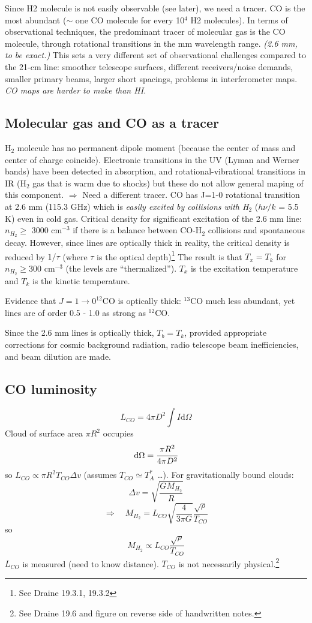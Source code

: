 \documentclass[11pt]{article}
\newcommand{\mar}[1]{\hspace{0pt}\marginpar{-\textcolor{black}{#1}-}}
\newcommand{\mynotes}[1]{{\fontfamily{cmss}\selectfont \textit{#1}}}
\begin{document}
Since H2 molecule is not
easily observable (see later), we need a tracer. CO is the most abundant
($\sim$ one CO molecule for every 10$^{4}$ H2 molecules). In terms of
observational techniques, the predominant tracer of molecular gas is the
CO molecule, through rotational transitions in the mm wavelength range.
\mynotes{(2.6 mm, to be exact.)}
This sets a very different set of observational challenges compared to the
21-cm line: smoother telescope surfaces, different receivers/noise demands,
smaller primary beams, larger short spacings, problems in interferometer
maps. \mynotes{CO maps are harder to make than HI.}

\subsection{Molecular gas and CO as a tracer}
\mar{128}H$_{2}$ molecule has no permanent dipole moment (because the
center of mass and center of charge coincide). Electronic transitions in the
UV (Lyman and Werner bands) have been detected in absorption, and
rotational-vibrational transitions in IR (H$_{2}$ gas that is warm due to shocks)
but these do not allow general maping of this component.
$\Rightarrow$ Need a different tracer. CO has J=1-0 rotational transition
at 2.6 mm (115.3 GHz) which is \emph{easily excited by collisions with
H$_{2}$} ($h\nu/k$ = 5.5 K) even in cold gas. Critical density for
significant excitation of the 2.6 mm line:
$n_{H_{2}} \geq$ 3000 cm$^{-3}$ if there is a balance between CO-H$_{2}$
collisions and spontaneous decay. However, since lines are optically thick
in reality, the critical density is reduced by $1/\tau$ (where $\tau$ is the
optical depth)\footnote{
    See Draine 19.3.1, 19.3.2}
The result is that $T_{x} = T_{k}$ for $n_{H_{2}} \geq 300$ cm$^{-3}$
(the levels are ``thermalized''). $T_{x}$ is the excitation temperature and
$T_{k}$ is the kinetic temperature.

\mar{129}Evidence that $J = 1 \rightarrow 0 ^{12}$CO is optically thick:
$^{13}$CO much less abundant, yet lines are of order 0.5 - 1.0 as strong
as $^{12}$CO.

Since the 2.6 mm lines is optically thick, $T_{b} = T_{k}$, provided
appropriate corrections for cosmic background radiation, radio telescope
beam inefficiencies, and beam dilution are made.

\subsection{CO luminosity}
\mar{130}
\[
    L_{CO} = 4{\pi}D^{2} \int{ I \mathrm{d}\Omega }
    \]
Cloud of surface area ${\pi}R^{2}$ occupies
\[
    \mathrm{d}\Omega = \cfrac{{\pi}R^{2}}{4{\pi}D^{2}}
    \]
so $L_{CO} \propto {\pi}R^{2} T_{CO} {\Delta}v$
(assumes $T_{CO} \simeq T_{A}^{*}$ \ldots).
For gravitationally bound clouds:
\[
    {\Delta}v = \sqrt{ \frac{GM_{H_{2}}}{R} }
    \]
\[
    \Longrightarrow \quad
    M_{H_{2}} = L_{CO} \sqrt{ \frac{4}{3{\pi}G} } \frac{\sqrt{\rho}}{T_{CO}}
    \]
so
\[
    M_{H_{2}} \propto L_{CO} \frac{\sqrt{\rho}}{T_{CO}}
    \]
$L_{CO}$ is measured (need to know distance). $T_{CO}$ is not necessarily
physical.\footnote{
    See Draine 19.6 and figure on reverse side of handwritten notes.}
\end{document}

